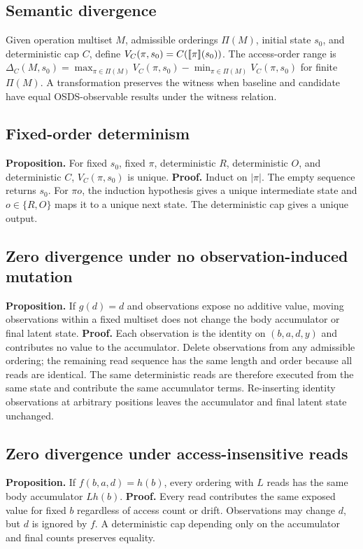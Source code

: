 \subsection{Semantic divergence}
Given operation multiset $M$, admissible orderings $\Pi(M)$, initial state $s_0$, and deterministic cap $C$, define $V_C(\pi,s_0)=C(\lbrack\!\lbrack \pi \rbrack\!\rbrack(s_0))$. The access-order range is $\Delta_C(M,s_0)=\max_{\pi\in\Pi(M)} V_C(\pi,s_0)-\min_{\pi\in\Pi(M)} V_C(\pi,s_0)$ for finite $\Pi(M)$. A transformation preserves the witness when baseline and candidate have equal OSDS-observable results under the witness relation.

\subsection{Fixed-order determinism}
\textbf{Proposition.} For fixed $s_0$, fixed $\pi$, deterministic $R$, deterministic $O$, and deterministic $C$, $V_C(\pi,s_0)$ is unique. \textbf{Proof.} Induct on $|\pi|$. The empty sequence returns $s_0$. For $\pi o$, the induction hypothesis gives a unique intermediate state and $o\in\{R,O\}$ maps it to a unique next state. The deterministic cap gives a unique output.

\subsection{Zero divergence under no observation-induced mutation}
\textbf{Proposition.} If $g(d)=d$ and observations expose no additive value, moving observations within a fixed multiset does not change the body accumulator or final latent state. \textbf{Proof.} Each observation is the identity on $(b,a,d,y)$ and contributes no value to the accumulator. Delete observations from any admissible ordering; the remaining read sequence has the same length and order because all reads are identical. The same deterministic reads are therefore executed from the same state and contribute the same accumulator terms. Re-inserting identity observations at arbitrary positions leaves the accumulator and final latent state unchanged.

\subsection{Zero divergence under access-insensitive reads}
\textbf{Proposition.} If $f(b,a,d)=h(b)$, every ordering with $L$ reads has the same body accumulator $Lh(b)$. \textbf{Proof.} Every read contributes the same exposed value for fixed $b$ regardless of access count or drift. Observations may change $d$, but $d$ is ignored by $f$. A deterministic cap depending only on the accumulator and final counts preserves equality.

